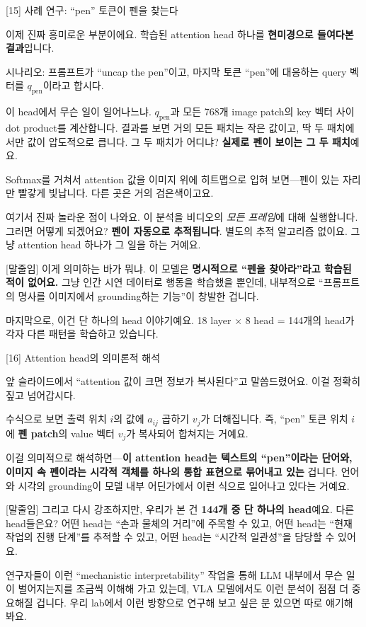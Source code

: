 \documentclass[aspectratio=169,10pt]{beamer}
\newenvironment{script}{%
  \footnotesize
  \setlength{\parskip}{0.5em}
  \setlength{\parindent}{0pt}
}{}
\begin{document}
\begin{frame}{[15] 사례 연구: ``pen'' 토큰이 펜을 찾는다}
\begin{script}
이제 진짜 흥미로운 부분이에요. 학습된 attention head 하나를 \textbf{현미경으로 들여다본 결과}입니다.

시나리오: 프롬프트가 ``uncap the pen''이고, 마지막 토큰 ``pen''에 대응하는 query 벡터를 $q_\text{pen}$이라고 합시다.

이 head에서 무슨 일이 일어나느냐. $q_\text{pen}$과 모든 768개 image patch의 key 벡터 사이 dot product를 계산합니다. 결과를 보면 \alert{거의 모든 패치는 작은 값}이고, \alert{딱 두 패치에서만 값이 압도적으로 큽니다}. 그 두 패치가 어디냐? \textbf{실제로 펜이 보이는 그 두 패치}예요.

Softmax를 거쳐서 attention 값을 이미지 위에 히트맵으로 입혀 보면---펜이 있는 자리만 빨갛게 빛납니다. 다른 곳은 거의 검은색이고요.

여기서 \alert{진짜 놀라운 점}이 나와요. 이 분석을 비디오의 \emph{모든 프레임}에 대해 실행합니다. 그러면 어떻게 되겠어요? \textbf{펜이 자동으로 추적됩니다}. 별도의 추적 알고리즘 없이요. 그냥 attention head 하나가 그 일을 하는 거예요.

[말줄임] 이게 의미하는 바가 뭐냐. 이 모델은 \textbf{명시적으로 ``펜을 찾아라''라고 학습된 적이 없어요.} 그냥 인간 시연 데이터로 행동을 학습했을 뿐인데, 내부적으로 ``프롬프트의 명사를 이미지에서 grounding하는 기능''이 \alert{창발}한 겁니다.

마지막으로, 이건 단 하나의 head 이야기예요. 18 layer × 8 head = 144개의 head가 각자 다른 패턴을 학습하고 있습니다.
\end{script}
\end{frame}

\begin{frame}{[16] Attention head의 의미론적 해석}
\begin{script}
앞 슬라이드에서 ``attention 값이 크면 정보가 복사된다''고 말씀드렸어요. 이걸 정확히 짚고 넘어갑시다.

수식으로 보면 출력 위치 $i$의 값에 $a_{ij}$ 곱하기 $v_j$가 더해집니다. 즉, ``pen'' 토큰 위치 $i$에 \textbf{펜 patch}의 value 벡터 $v_j$가 \alert{복사되어 합쳐지는} 거예요.

이걸 의미적으로 해석하면---\textbf{이 attention head는 텍스트의 ``pen''이라는 단어와, 이미지 속 펜이라는 시각적 객체를 하나의 통합 표현으로 묶어내고 있는} 겁니다. 언어와 시각의 grounding이 모델 내부 어딘가에서 이런 식으로 일어나고 있다는 거예요.

[말줄임] 그리고 다시 강조하지만, 우리가 본 건 \textbf{144개 중 단 하나의 head}예요. 다른 head들은요? 어떤 head는 ``손과 물체의 거리''에 주목할 수 있고, 어떤 head는 ``현재 작업의 진행 단계''를 추적할 수 있고, 어떤 head는 ``시간적 일관성''을 담당할 수 있어요.

연구자들이 이런 ``mechanistic interpretability'' 작업을 통해 LLM 내부에서 무슨 일이 벌어지는지를 조금씩 이해해 가고 있는데, VLA 모델에서도 이런 분석이 점점 더 중요해질 겁니다. 우리 lab에서 이런 방향으로 연구해 보고 싶은 분 있으면 따로 얘기해 봐요.
\end{script}
\end{frame}
\end{document}
